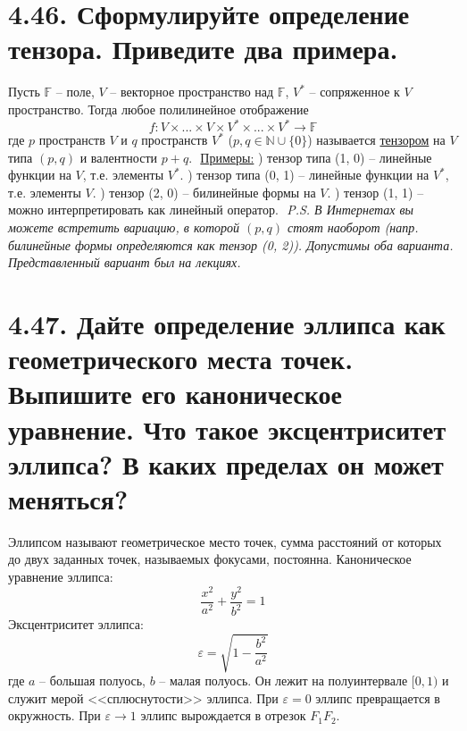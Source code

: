 \documentclass{article}
\begin{document}
\section*{\LARGE 4.46. Сформулируйте определение тензора. Приведите два примера.}
Пусть $\mathbb{F}$ -- поле, $V$ -- векторное пространство над $\mathbb{F}$, $V^*$ -- сопряженное к $V$ пространство. Тогда любое полилинейное отображение
$$f : V \times ... \times V \times V^* \times ... \times V^* \rightarrow \mathbb{F}$$
где $p$ пространств $V$ и $q$ пространств $V^*$ ($p, q \in \mathbb{N} \cup \{0\}$) называется \underline{тензором} на $V$ типа $(p, q)$ и валентности $p + q$.
\newline $ $
\newline \underline{Примеры:}
) тензор типа (1, 0) -- линейные функции на $V$, т.е. элементы $V^*$.
) тензор типа (0, 1) -- линейные функции на $V^*$, т.е. элементы $V$.
) тензор (2, 0) -- билинейные формы на $V$.
) тензор (1, 1) -- можно интерпретировать как линейный оператор.
\newline $ $
\newline \textit{P.S. В Интернетах вы можете встретить вариацию, в которой $(p, q)$ стоят наоборот (напр. билинейные формы определяются как тензор (0, 2)). Допустимы оба варианта. Представленный вариант был на лекциях. }

\section*{\LARGE 4.47. Дайте определение эллипса как геометрического места точек. Выпишите его каноническое уравнение. Что такое эксцентриситет эллипса? В каких пределах он может меняться? }
Эллипсом называют геометрическое место точек, сумма расстояний от которых до двух заданных точек, называемых фокусами, постоянна.
\newline Каноническое уравнение эллипса:
$$
\frac{x^2}{a^2} + \frac{y^2}{b^2} = 1
$$
Эксцентриситет эллипса:
$$
\varepsilon = \sqrt{1 - \frac{b^2}{a^2}}
$$
где $a$ -- большая полуось, $b$ -- малая полуось. Он лежит на полуинтервале $[0, 1)$ и служит мерой <<сплюснутости>> эллипса. При $\varepsilon = 0$ эллипс превращается в окружность. При $\varepsilon \rightarrow 1$ эллипс вырождается в отрезок $F_1F_2$.
\end{document}
